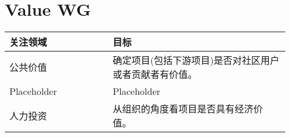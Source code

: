 

    \section{Value WG}
    \begin{table}[ht!]
        \centering
        \begin{tabular}{|p{0.35\linewidth} | p{0.6\linewidth}|}
            \hline
            \hfil \textbf{关注领域}  & \hfil \textbf{目标} \\
            \hline
        		公共价值 & 确定项目(包括下游项目)是否对社区用户或者贡献者有价值。 \\ 
		\hline
		Placeholder & Placeholder \\ 
		\hline
		人力投资 & 从组织的角度看项目是否具有经济价值。 \\ 
		\hline
    \end{tabular}
    \end{table}
        
\clearpage
 
 
 
